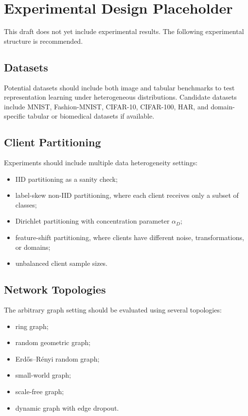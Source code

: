 \documentclass[conference]{IEEEtran}
\begin{document}
\section{Experimental Design Placeholder}
\label{sec:experimental-design-placeholder}

This draft does not yet include experimental results. The following experimental structure is recommended.

\subsection{Datasets}
\label{subsec:datasets}
Potential datasets should include both image and tabular benchmarks to test representation learning under heterogeneous distributions. Candidate datasets include MNIST, Fashion-MNIST, CIFAR-10, CIFAR-100, HAR, and domain-specific tabular or biomedical datasets if available.

\subsection{Client Partitioning}
\label{subsec:client-partitioning}
Experiments should include multiple data heterogeneity settings:
\begin{itemize}
    \item IID partitioning as a sanity check;
    \item label-skew non-IID partitioning, where each client receives only a subset of classes;
    \item Dirichlet partitioning with concentration parameter \(\alpha_D\);
    \item feature-shift partitioning, where clients have different noise, transformations, or domains;
    \item unbalanced client sample sizes.
\end{itemize}

\subsection{Network Topologies}
\label{subsec:network-topologies}
The arbitrary graph setting should be evaluated using several topologies:
\begin{itemize}
    \item ring graph;
    \item random geometric graph;
    \item Erd\H{o}s--R\'{e}nyi random graph;
    \item small-world graph;
    \item scale-free graph;
    \item dynamic graph with edge dropout.
\end{itemize}
\end{document}
